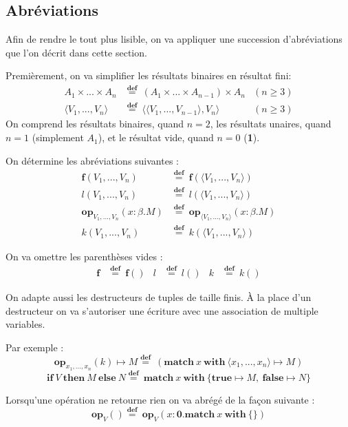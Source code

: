 \subsection*{Abréviations}

	Afin de rendre le tout plus lisible, on va appliquer une succession d'abréviations que l'on décrit dans cette section.
	
	Premièrement, on va simplifier les résultats binaires en résultat fini:
	\begin{align*}
		A_1 \times ... \times A_n &\overset{\textbf{def}}{=}~(A_1 \times ... \times A_{n-1}) \times A_n & (n \geq 3)\\
		\langle V_1 , ... , V_n\rangle &\overset{\textbf{def}}{=}~\langle\langle V_1 , ... , V_{n-1}\rangle , V_n\rangle & (n \geq 3)
	\end{align*}
	On comprend les résultats binaires, quand $n=2$, les résultats unaires, quand $n=1$ (simplement $A_1$), et le résultat vide, quand $n=0$ (\textbf{1}).
	
	On détermine les abréviations suivantes :
	\begin{align*}
		\textbf{f}(V_1,...,V_n) &\overset{\textbf{def}}{=}~\textbf{f}(\langle V_1,...,V_n\rangle)\\
		l(V_1,...,V_n) &\overset{\textbf{def}}{=}~l(\langle V_1,...,V_n\rangle)\\
		\textbf{op}_{V_1,...,V_n}(x:\beta.M) &\overset{\textbf{def}}{=}~\textbf{op}_{\langle V_1,...,V_n\rangle}(x:\beta.M)\\
		k(V_1,...,V_n) &\overset{\textbf{def}}{=}~k(\langle V_1,...,V_n\rangle)
	\end{align*}
	
	On va omettre les parenthèses vides : 
	\begin{align*}
		\textbf{f} &\overset{\textbf{def}}{=}~\textbf{f}() & l &\overset{\textbf{def}}{=}~l() & k &\overset{\textbf{def}}{=}~k()
	\end{align*}
	
	On adapte aussi les destructeurs de tuples de taille finis. À la place d'un destructeur on va s'autoriser une écriture avec une association de multiple variables.
	
	\begin{exemple}
		Par exemple : 
		\[\textbf{op}_{x_1,...,x_n}(k) \mapsto M \overset{\textbf{def}}{=}~(\textbf{match}~x~\textbf{with}~\langle x_1,...,x_n\rangle \mapsto M)\]
		\[\textbf{if}~V~\textbf{then}~M~\textbf{else}~N\overset{\textbf{def}}{=}~\textbf{match}~x~\textbf{with}~\{\textbf{true} \mapsto M,~\textbf{false} \mapsto N\} \]
	\end{exemple}

	Lorsqu'une opération ne retourne rien on va abrégé de la façon suivante : 
	\[\textbf{op}_V() \overset{\textbf{def}}{=}~\textbf{op}_V(x:\textbf{0}.\textbf{match}~x~\textbf{with}~\{\})  \]